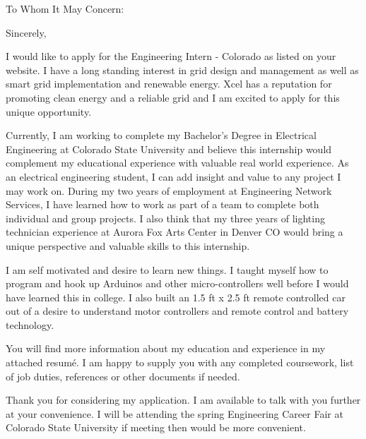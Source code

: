 \documentclass[11pt,letterpaper,sans]{moderncv}        %
\begin{document}



\clearpage
{}
\date{\today}
\opening{To Whom It May Concern:}
\closing{Sincerely,}
\makelettertitle

I would like to apply for the Engineering Intern - Colorado as listed on your website. I have a long standing interest in grid design and management as well as smart grid implementation and renewable energy. Xcel has a reputation for promoting clean energy and a reliable grid and I am excited to apply for this unique opportunity.

Currently, I am working to complete my Bachelor's Degree in Electrical Engineering at Colorado State University and believe this internship would complement my educational experience with valuable real world experience. As an electrical engineering student, I can add insight and value to any project I may work on. During my two years of employment at Engineering Network Services, I have learned how to work as part of a team to complete both individual and group projects. I also think that my three years of lighting technician experience at Aurora Fox Arts Center in Denver CO would bring a unique perspective and valuable skills to this internship.  

I am self motivated and desire to learn new things. I taught myself how to program and hook up Arduinos and other micro-controllers well before I would have learned this in college. I also built an 1.5 ft x 2.5 ft remote controlled car out of a desire to understand motor controllers and remote control and battery technology.

You will find more information about my education and experience in my attached resum\'e. I am happy to supply you with any completed coursework, list of job duties, references or other documents if needed.

Thank you for considering my application. I am available to talk with you further at your convenience. I will be attending the spring Engineering Career Fair at Colorado State University if meeting then would be more convenient.



\makeletterclosing
\end{document}
